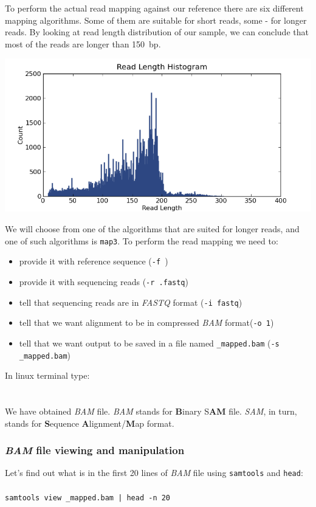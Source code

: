 To perform the actual read mapping against our reference there are six different
mapping algorithms. Some of them are suitable for short reads, some - for longer reads.
By looking at read length distribution of our sample, we can conclude that most of
the reads are longer than 150~bp.
\begin{center}
  \includegraphics[width=\linewidth, keepaspectratio]{snp_calling/IonXpress_001_rawlib.read_len_histogram.png}
\end{center}
We will choose from one of the algorithms that are suited for longer reads, and
one of such algorithms is \texttt{map3}. To perform the read mapping we need to:
\begin{itemize}
  \item provide it with reference sequence (\texttt{-f })
  \item provide it with sequencing reads (\texttt{-r \mapReads.fastq})
  \item tell that sequencing reads are in \textit{FASTQ} format (\texttt{-i fastq})
  \item tell that we want alignment to be in compressed \textit{BAM} format(\texttt{-o 1})
  \item tell that we want output to be saved in a file named \texttt{\mapReads\_mapped.bam} (\texttt{-s \mapReads\_mapped.bam})
\end{itemize}
In linux terminal type:\\~\\
\\

We have obtained \textit{BAM} file. \textit{BAM} stands for \textbf{B}inary S\textbf{AM} file.
\textit{SAM}, in turn, stands for \textbf{S}equence \textbf{A}lignment/\textbf{M}ap format.

\subsubsection{\textit{BAM} file viewing and manipulation}
Let's find out what is in the first 20 lines of \textit{BAM} file using \texttt{samtools} and \texttt{head}:\\~\\
\texttt{samtools view \mapReads\_mapped.bam | head -n 20}\\

